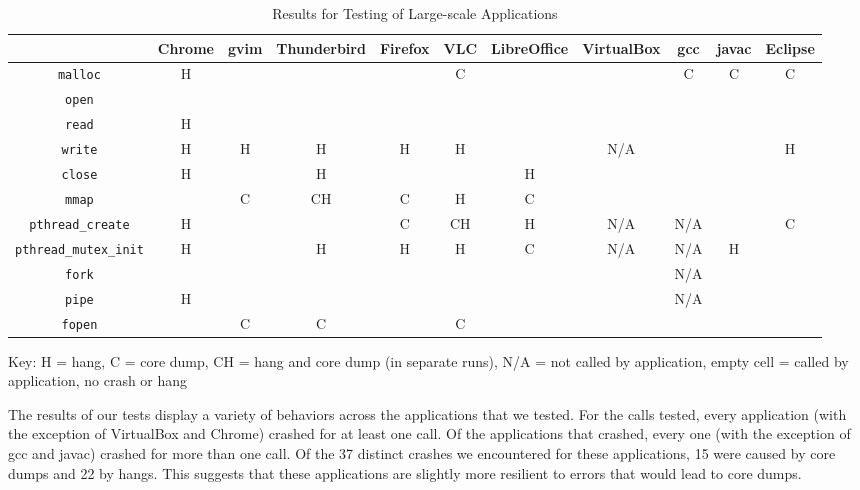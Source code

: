 \begin{table}[h!]
\centering
\caption{Results for Testing of Large-scale Applications}
		\begin{adjustbox}{width=\textwidth}
		\begin{tabular}{|c|c|c|c|c|c|c|c|c|c|c|}
			\hline
			& Chrome & gvim & Thunderbird & Firefox & VLC & LibreOffice & VirtualBox & gcc & javac & Eclipse\\
			\hline
			\texttt{malloc} & H & & & & C &  & & C & C & C \\ \hline
			\texttt{open} & & & & & & & & & & \\ \hline
			\texttt{read} & H & & & & & & & & & \\ \hline
			\texttt{write} & H & H & H & H & H & & N/A& & & H \\ \hline
			\texttt{close} & H & & H & & & H & & & & \\ \hline
			\texttt{mmap} & & C & CH & C & H & C & & & &\\ \hline
			\texttt{pthread\_create}& H & &  & C & CH & H & N/A& N/A& & C \\ \hline
			\texttt{pthread\_mutex\_init} & H & & H & H & H & C & N/A& N/A & H &  \\ \hline
			\texttt{fork} & & & & & & & & N/A & & \\ \hline
			\texttt{pipe} & H & & & & & &  & N/A & &\\ \hline
			\texttt{fopen} & & C & C & & C & & & & & \\ \hline
		\end{tabular} 
		\end{adjustbox}
		Key: H = hang, C = core dump, CH = hang and core dump (in separate runs), N/A = not called by application, empty cell = called by application, no crash or hang
\label{table:large_scale}
\end{table}

The results of our tests display a variety of behaviors across the applications that we tested. For the calls tested, every application (with the exception of VirtualBox and Chrome) crashed for at least one call. Of the applications that crashed, every one (with the exception of gcc and javac) crashed for more than one call. Of the 37 distinct crashes we encountered for these applications, 15 were caused by core dumps and 22 by hangs. This suggests that these applications are slightly more resilient to errors that would lead to core dumps. 

